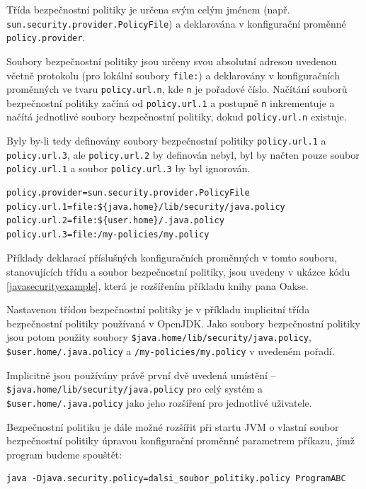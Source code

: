 Třída bezpečnostní politiky je určena svým celým jménem (např. {\tt sun.security.provider.PolicyFile}) a deklarována v konfigurační proměnné {\tt policy.provider}. \cite{refPolicyFiles}

Soubory bezpečnostní politiky jsou určeny svou absolutní adresou uvedenou včetně protokolu (pro lokální soubory {\tt file:}) a deklarovány v konfiguračních proměnných ve tvaru {\tt policy.url.n}, kde {\tt n} je pořadové číslo. Načítání souborů bezpečnostní politiky začíná od {\tt policy.url.1} a postupně {\tt n} inkrementuje a načítá jednotlivé soubory bezpečnostní politiky, dokud {\tt policy.url.n} existuje. \cite{refPolicyFiles}

Byly by-li tedy definovány soubory bezpečnostní politiky {\tt policy.url.1} a {\tt policy.url.3}, ale {\tt policy.url.2} by definován nebyl, byl by načten pouze soubor {\tt policy.url.1} a soubor {\tt policy.url.3} by byl ignorován. \cite{refPolicyFiles}

\begin{lstlisting}[caption=Význačnější proměnné konfiguračního souboru {\tt java.security}, label=javasecurityexample]
policy.provider=sun.security.provider.PolicyFile
policy.url.1=file:${java.home}/lib/security/java.policy
policy.url.2=file:${user.home}/.java.policy
policy.url.3=file:/my-policies/my.policy
\end{lstlisting}

Příklady deklarací příslušných konfiguračních proměnných v tomto souboru, stanovujících třídu a soubor bezpečnostní politiky, jsou uvedeny v ukázce kódu \ref{javasecurityexample}, která je rozšířením příkladu knihy pana Oakse. \cite[5.3.1]{oaks}

Nastavenou třídou bezpečnostní politiky je v příkladu implicitní třída bezpečnostní politiky používaná v OpenJDK. Jako soubory bezpečnostní politiky jsou potom použity soubory {\tt \${java.home}/lib/security/java.policy}, {\tt \${user.home}/.java.policy} a {\tt /my-policies/my.policy} v uvedeném pořadí.

Implicitně jsou používány právě první dvě uvedená umístění -- {\tt \${java.home}/lib/security/java.policy} pro celý systém a {\tt \${user.home}/.java.policy} jako jeho rozšíření pro jednotlivé uživatele. \cite{refSecurity}

Bezpečnostní politiku je dále možné rozšířit při startu JVM o vlastní soubor bezpečnostní politiky úpravou konfigurační proměnné parametrem příkazu, jímž program budeme spouštět: \cite[5.3.1]{oaks}

\begin{verbatim}
java -Djava.security.policy=dalsi_soubor_politiky.policy ProgramABC
\end{verbatim}

